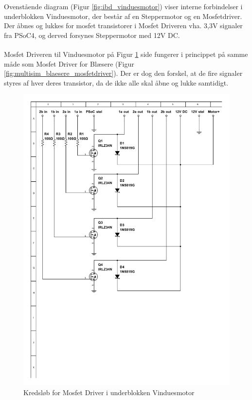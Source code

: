 Ovenstående diagram (Figur \ref{fig:ibd_vinduesmotor}) viser interne forbindelser i underblokken Vinduesmotor, der består af en Steppermotor og en Mosfetdriver. 
Der åbnes og lukkes for mosfet transistorer i Mosfet Driveren vha. 3,3V signaler fra PSoC4, og derved forsynes Steppermotor med 12V DC. 
\\\\
Mosfet Driveren til Vinduesmotor på Figur \ref{fig:multisim_vinduesmotor_mosfetdriver} side \pageref{fig:multisim_vinduesmotor_mosfetdriver} fungerer i princippet på samme måde som Mosfet Driver for Blæsere (Figur \ref{fig:multisim_blaesere_mosfetdriver}).
Der er dog den forskel, at de fire signaler styres af hver deres transistor, da de ikke alle skal åbne og lukke samtidigt. 

\begin{figure}[h]
\centering 
\includegraphics[width={\textwidth}, trim= 40 260 0 40, clip=true] {../fig/multisim_vinduesmotor_mosfetdriver.pdf}
\caption{Kredsløb for Mosfet Driver i underblokken Vinduesmotor}
\label{fig:multisim_vinduesmotor_mosfetdriver}
\end{figure}

